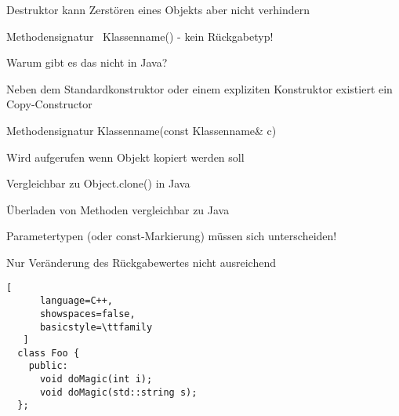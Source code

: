 \documentclass[10pt]{article}
\begin{document}
\begin{itemize*}
\begin{itemize*}
\begin{itemize*}
\begin{itemize*}
      \item Destruktor kann Zerstören eines Objekts aber nicht verhindern
      \item Methodensignatur ~Klassenname() - kein Rückgabetyp!
      \item Warum gibt es das nicht in Java?
    \end{itemize*}
    \item Neben dem Standardkonstruktor oder einem expliziten Konstruktor existiert ein Copy-Constructor
    \begin{itemize*}
      \item Methodensignatur Klassenname(const Klassenname\& c)
      \item Wird aufgerufen wenn Objekt kopiert werden soll
      \item Vergleichbar zu Object.clone() in Java
    \end{itemize*}
  \end{itemize*}
  \item Überladen von Methoden vergleichbar zu Java
  \begin{itemize*}
    \item Parametertypen (oder const-Markierung) müssen sich unterscheiden!
    \item Nur Veränderung des Rückgabewertes nicht ausreichend
    \begin{lstlisting}[
      language=C++,
      showspaces=false,
      basicstyle=\ttfamily
   ]
  class Foo {
    public:
      void doMagic(int i);
      void doMagic(std::string s);
  };
  \end{lstlisting}
  \end{itemize*}
\end{itemize*}



\end{itemize*}
\end{document}
